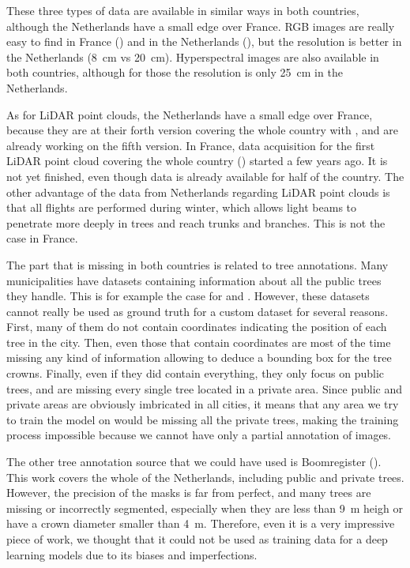 \documentclass[
]{report}
\begin{document}
These three types of data are available in similar ways in both
countries, although the Netherlands have a small edge over France. RGB
images are really easy to find in France (\autocite{IGN_BDORTHO}) and in
the Netherlands (\autocite{Luchtfotos}), but the resolution is better in
the Netherlands (8~cm vs 20~cm). Hyperspectral images are also available
in both countries, although for those the resolution is only 25~cm in
the Netherlands.

As for LiDAR point clouds, the Netherlands have a small edge over
France, because they are at their forth version covering the whole
country with \autocite{AHN4}, and are already working on the fifth
version. In France, data acquisition for the first LiDAR point cloud
covering the whole country (\autocite{IGN_LiDARHD}) started a few years
ago. It is not yet finished, even though data is already available for
half of the country. The other advantage of the data from Netherlands
regarding LiDAR point clouds is that all flights are performed during
winter, which allows light beams to penetrate more deeply in trees and
reach trunks and branches. This is not the case in France.

The part that is missing in both countries is related to tree
annotations. Many municipalities have datasets containing information
about all the public trees they handle. This is for example the case for
\autocite{amsterdam_trees} and \autocite{bordeaux_trees}. However, these
datasets cannot really be used as ground truth for a custom dataset for
several reasons. First, many of them do not contain coordinates
indicating the position of each tree in the city. Then, even those that
contain coordinates are most of the time missing any kind of information
allowing to deduce a bounding box for the tree crowns. Finally, even if
they did contain everything, they only focus on public trees, and are
missing every single tree located in a private area. Since public and
private areas are obviously imbricated in all cities, it means that any
area we try to train the model on would be missing all the private
trees, making the training process impossible because we cannot have
only a partial annotation of images.

The other tree annotation source that we could have used is Boomregister
(\autocite{boomregister}). This work covers the whole of the
Netherlands, including public and private trees. However, the precision
of the masks is far from perfect, and many trees are missing or
incorrectly segmented, especially when they are less than 9~m heigh or
have a crown diameter smaller than 4~m. Therefore, even it is a very
impressive piece of work, we thought that it could not be used as
training data for a deep learning models due to its biases and
imperfections.
\end{document}
